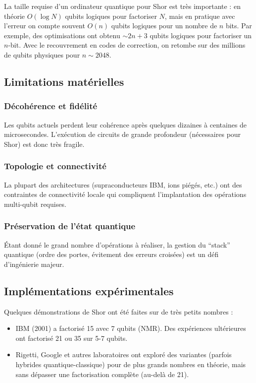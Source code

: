 \documentclass[11pt,a4paper]{article}
\begin{document}
La taille requise d'un ordinateur quantique pour Shor est très importante : en théorie $O(\log N)$ qubits logiques pour factoriser $N$, mais en pratique avec l'erreur on compte souvent $O(n)$ qubits logiques pour un nombre de $n$ bits. Par exemple, des optimisations ont obtenu $\sim 2n+3$ qubits logiques pour factoriser un $n$-bit. Avec le recouvrement en codes de correction, on retombe sur des millions de qubits physiques pour $n \sim 2048$.

\subsection{Limitations matérielles}

\subsubsection*{Décohérence et fidélité}
Les qubits actuels perdent leur cohérence après quelques dizaines à centaines de microsecondes. L'exécution de circuits de grande profondeur (nécessaires pour Shor) est donc très fragile.

\subsubsection*{Topologie et connectivité}
La plupart des architectures (supraconducteurs IBM, ions piégés, etc.) ont des contraintes de connectivité locale qui compliquent l'implantation des opérations multi-qubit requises.

\subsubsection*{Préservation de l'état quantique}
Étant donné le grand nombre d'opérations à réaliser, la gestion du ``stack'' quantique (ordre des portes, évitement des erreurs croisées) est un défi d'ingénierie majeur.

\subsection{Implémentations expérimentales}

Quelques démonstrations de Shor ont été faites sur de très petits nombres :

\begin{itemize}
\item IBM (2001) a factorisé 15 avec 7 qubits (NMR). Des expériences ultérieures ont factorisé 21 ou 35 sur 5-7 qubits.

\item Rigetti, Google et autres laboratoires ont exploré des variantes (parfois hybrides quantique-classique) pour de plus grands nombres en théorie, mais sans dépasser une factorisation complète (au-delà de 21).

\end{itemize}
\end{document}
